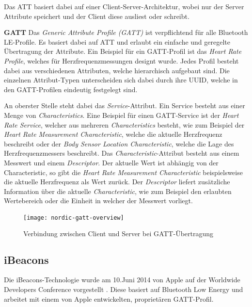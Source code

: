 Das ATT basiert dabei auf einer Client-Server-Architektur, wobei nur der Server Attribute speichert und der Client diese ausliest oder schreibt.

\textbf{GATT}
Das \emph{Generic Attribute Profile (GATT)} ist verpflichtend für alle Bluetooth LE-Profile. Es basiert dabei auf ATT und erlaubt ein einfache und geregelte Übertragung der Attribute. Ein Beispiel für ein GATT-Profil ist das \emph{Heart Rate Profile}, welches für Herzfrequenzmessungen designt wurde.
Jedes Profil besteht dabei aus verschiedenen Attributen, welche hierarchisch aufgebaut sind.
Die einzelnen Attribut-Typen unterscheiden sich dabei durch ihre UUID, welche in den GATT-Profilen eindeutig festgelegt sind.

An oberster Stelle steht dabei das \emph{Service}-Attribut. Ein Service besteht aus einer Menge von \emph{Characteristics}. Eine Beispiel für einen GATT-Service ist der \emph{Heart Rate Service}, welcher aus mehreren \emph{Characteristics} besteht, wie zum Beispiel der \emph{Heart Rate Measurement Characteristic}, welche die aktuelle Herzfrequenz beschreibt oder der \emph{Body Sensor Location Characteristic}, welche die Lage des Herzfrequenzmessers beschreibt. 
Das \emph{Characteristic}-Attribut besteht aus einem Messwert und einem \emph{Descriptor}. Der aktuelle Wert ist abhängig von der Characteristic, so gibt die \emph{Heart Rate Measurement Characteristic} beispielsweise die aktuelle Herzfrequenz als Wert zurück. 
Der \emph{Descriptor} liefert zusätzliche Information über die aktuelle \emph{Characteristic}, wie zum Beispiel den erlaubten Wertebereich oder die Einheit in welcher der Messwert vorliegt.

\begin{figure}[htb!]
		\centering
	\texttt{[image: nordic-gatt-overview]}
	\caption{Verbindung zwischen Client und Server bei GATT-Übertragung}
	\label{nordic-gatt-overview}
	\end{figure}


\subsection{iBeacons}
\label{sec:technologies:bluetoothLE:ibeacons}
Die iBeacons-Technologie wurde am 10.Juni 2014 von Apple auf der Worldwide Developers Conference vorgestellt \cite{appleinsideribeacons}. 
Diese basiert auf Bluetooth Low Energy und arbeitet mit einem von Apple entwickelten, proprietären GATT-Profil.

